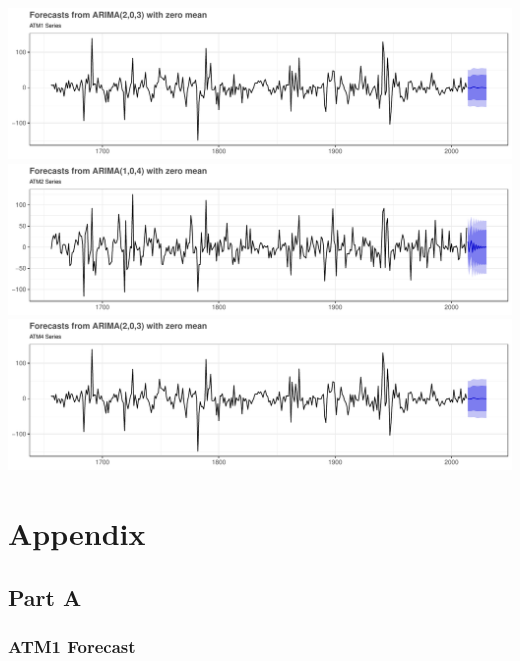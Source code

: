 \documentclass[openany]{book}
\begin{document}
\includegraphics{Part-A-JM_files/figure-latex/unnamed-chunk-7-1.pdf}
\includegraphics{Part-A-JM_files/figure-latex/unnamed-chunk-7-2.pdf}
\includegraphics{Part-A-JM_files/figure-latex/unnamed-chunk-7-3.pdf}

\hypertarget{Appendix}{%
\chapter*{Appendix}\label{Appendix}}

\hypertarget{Part-A}{%
\section*{Part A}\label{Part-A}}

\hypertarget{Part-A-FC1}{%
\subsection*{ATM1 Forecast}\label{Part-A-FC1}}
\end{document}
